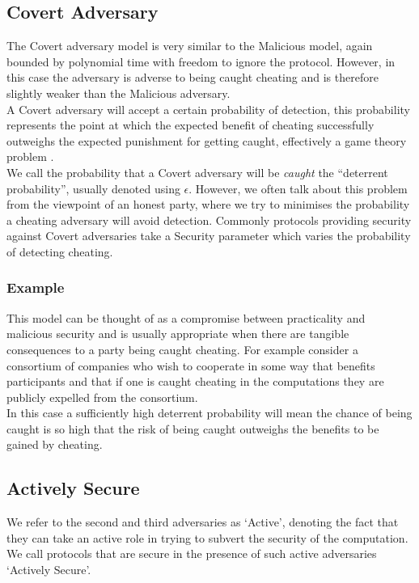 \documentclass[ %
                    author={Nicholas Tutte},
                supervisor={Prof. Nigel Smart},
                    degree={MEng},
                     title={Secure Two Party Computation},
                  subtitle={A practical comparison of recent protocols},
                      type={Research - GG1K},
                      year={2015} ]{dissertation}
\begin{document}
			\subsection{Covert Adversary}
				The Covert adversary model is very similar to the Malicious model, again bounded by polynomial time with freedom to ignore the protocol. However, in this case the adversary is adverse to being caught cheating and is therefore slightly weaker than the Malicious adversary.\\

				A Covert adversary will accept a certain probability of detection, this probability represents the point at which the expected benefit of cheating successfully outweighs the expected punishment for getting caught, effectively a game theory problem \cite{WhenGameTheoryMetSMC}.\\

				We call the probability that a Covert adversary will be \emph{caught} the ``deterrent probability'', usually denoted using $\epsilon$. However, we often talk about this problem from the viewpoint of an honest party, where we try to minimises the probability a cheating adversary will avoid detection. Commonly protocols providing security against Covert adversaries take a Security parameter which varies the probability of detecting cheating.

				\subsubsection{Example} 

					This model can be thought of as a compromise between practicality and malicious security and is usually appropriate when there are tangible consequences to a party being caught cheating. For example consider a consortium of companies who wish to cooperate in some way that benefits participants and that if one is caught cheating in the computations they are publicly expelled from the consortium.\\

					In this case a sufficiently high deterrent probability will mean the chance of being caught is so high that the risk of being caught outweighs the benefits to be gained by cheating.

			\subsection{Actively Secure}
				We refer to the second and third adversaries as `Active', denoting the fact that they can take an active role in trying to subvert the security of the computation. We call protocols that are secure in the presence of such active adversaries `Actively Secure'.
\end{document}

